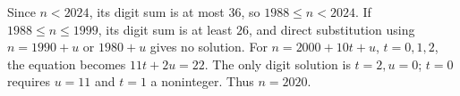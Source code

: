 Since $n<2024$, its digit sum is at most $36$, so $1988\le n<2024$. If $1988\le n\le1999$, its digit sum is at least $26$, and direct substitution using $n=1990+u$ or $1980+u$ gives no solution. For $n=2000+10t+u$, $t=0,1,2$, the equation becomes $11t+2u=22$. The only digit solution is $t=2,u=0$; $t=0$ requires $u=11$ and $t=1$ a noninteger. Thus $\boxed{n=2020}$.
